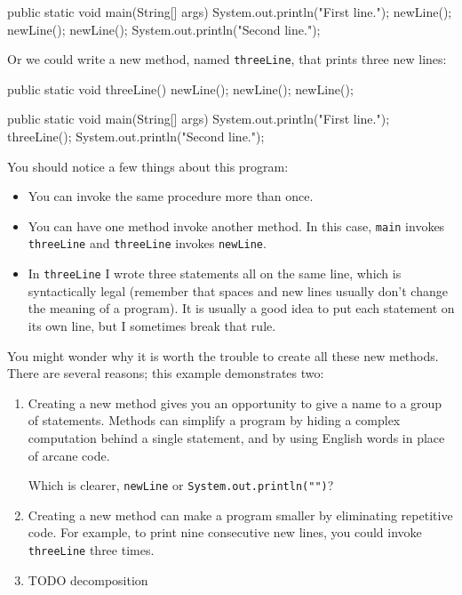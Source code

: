 \begin{code}
    public static void main(String[] args) {
        System.out.println("First line.");
        newLine();
        newLine();
        newLine();
        System.out.println("Second line.");
    }
\end{code}

Or we could write a new method, named {\tt threeLine}, that prints three new lines:

\begin{code}
    public static void threeLine() {
        newLine();  newLine();  newLine();
    }

    public static void main(String[] args) {
        System.out.println("First line.");
        threeLine();
        System.out.println("Second line.");
    }
\end{code}

You should notice a few things about this program:

\begin{itemize}

\item You can invoke the same procedure more than once.

\item You can have one method invoke another method.
In this case, {\tt main} invokes {\tt threeLine} and {\tt threeLine} invokes {\tt newLine}.

\item In {\tt threeLine} I wrote three statements all on the same line, which is syntactically legal (remember that spaces and new lines usually don't change the meaning of a program).
It is usually a good idea to put each statement on its own line, but I sometimes break that rule.

\end{itemize}

You might wonder why it is worth the trouble to create all these new methods.
There are several reasons; this example demonstrates two:

\begin{enumerate}

\item Creating a new method gives you an opportunity to give a name to a group of statements.
Methods can simplify a program by hiding a complex computation behind a single statement, and by using English words in place of arcane code.

Which is clearer, {\tt newLine} or {\tt System.out.println("")}?

\item Creating a new method can make a program smaller by eliminating repetitive code.
For example, to print nine consecutive new lines, you could invoke {\tt threeLine} three times.

\item TODO decomposition

\end{enumerate}

